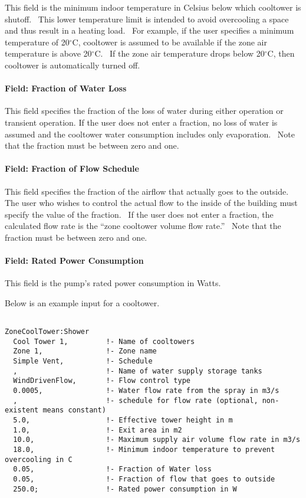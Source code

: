 This field is the minimum indoor temperature in Celsius below which cooltower is shutoff. ~This lower temperature limit is intended to avoid overcooling a space and thus result in a heating load. ~For example, if the user specifies a minimum temperature of 20$^\circ$C, cooltower is assumed to be available if the zone air temperature is above 20$^\circ$C. ~If the zone air temperature drops below 20$^\circ$C, then cooltower is automatically turned off.

\paragraph{Field: Fraction of Water Loss}\label{field-fraction-of-water-loss}

This field specifies the fraction of the loss of water during either operation or transient operation. If the user does not enter a fraction, no loss of water is assumed and the cooltower water consumption includes only evaporation.~ Note that the fraction must be between zero and one.

\paragraph{Field: Fraction of Flow Schedule}\label{field-fraction-of-flow-schedule}

This field specifies the fraction of the airflow that actually goes to the outside.~ The user who wishes to control the actual flow to the inside of the building must specify the value of the fraction.~ If the user does not enter a fraction, the calculated flow rate is the ``zone cooltower volume flow rate.''~ Note that the fraction must be between zero and one.

\paragraph{Field: Rated Power Consumption}\label{field-rated-power-consumption}

This field is the pump's rated power consumption in Watts.

Below is an example input for a cooltower.

\begin{lstlisting}

ZoneCoolTower:Shower
  Cool Tower 1,         !- Name of cooltowers
  Zone 1,               !- Zone name
  Simple Vent,          !- Schedule
  ,                     !- Name of water supply storage tanks
  WindDrivenFlow,       !- Flow control type
  0.0005,               !- Water flow rate from the spray in m3/s
  ,                     !- schedule for flow rate (optional, non-existent means constant)
  5.0,                  !- Effective tower height in m
  1.0,                  !- Exit area in m2
  10.0,                 !- Maximum supply air volume flow rate in m3/s
  18.0,                 !- Minimum indoor temperature to prevent overcooling in C
  0.05,                 !- Fraction of Water loss
  0.05,                 !- Fraction of flow that goes to outside
  250.0;                !- Rated power consumption in W
\end{lstlisting}

